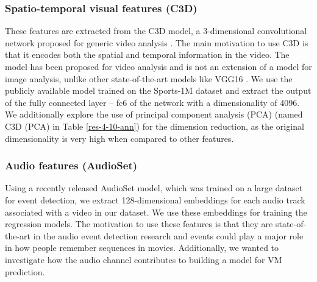 \documentclass[sigconf]{acmart}
\begin{document}

\subsubsection{Spatio-temporal visual features (C3D)}
\label{c3d-feat}
These features are extracted from the C3D model, a 3-dimensional convolutional network proposed for generic video analysis \cite{c3d-feat}. 
The main motivation to use C3D is that it encodes both the spatial and temporal information in the video.
The model has been proposed for video analysis and is not an extension of a model for image analysis, unlike other state-of-the-art models like VGG16 \cite{vgg16}.
We use the publicly available model trained on the Sports-1M dataset \cite{c3d-feat} and extract the output of the fully connected layer -- fc6 of the network with a dimensionality of 4096.
We additionally explore the use of principal component analysis (PCA) (named C3D (PCA) in Table \ref{res-4-10-ann}) for the dimension reduction, as the original dimensionality is very high when compared to other features.

\subsubsection{Audio features (AudioSet)}
\label{as-feat}
Using a recently released AudioSet \cite{audioset-feat} model, which was trained on a large dataset for event detection, we extract 128-dimensional embeddings for each audio track associated with a video in our dataset.
We use these embeddings for training the regression models.
The motivation to use these features is that they are state-of-the-art in the audio event detection research and events could play a major role in how people remember sequences in movies.
Additionally, we wanted to investigate how the audio channel contributes to building a model for VM prediction.
\end{document}
